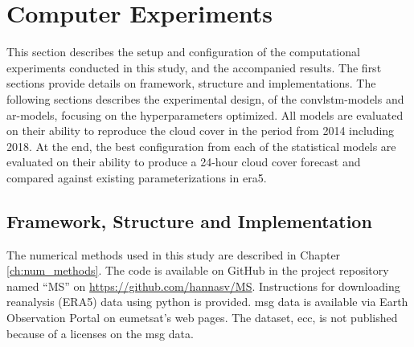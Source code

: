 \section{Computer Experiments} \label{ch:computer_experiments}
This section describes the setup and configuration of the computational experiments conducted in this study, and the accompanied results. The first sections provide details on framework, structure and implementations. The following sections describes the experimental design, %
of the \acrshort{convlstm}-models and \acrshort{ar}-models, focusing on the hyperparameters optimized. All models are evaluated on their ability to reproduce the cloud cover in the period from 2014 including 2018. At the end, the best configuration from each of the statistical models are evaluated on their ability to produce a 24-hour cloud cover forecast and compared against existing parameterizations in \acrshort{era5}.

\subsection{Framework, Structure and Implementation} \label{sec:structure_and_implementations} \label{sec:framework}
The numerical methods used in this study are described in Chapter \ref{ch:num_methods}. The code is available on GitHub in the project repository named ``MS'' on \href{https://github.com/hannasv/MS}{https://github.com/hannasv/MS}. Instructions for downloading 
reanalysis (ERA5) data using python is provided. \acrshort{msg} data is available via Earth Observation Portal on \acrshort{eumetsat}'s web pages. The dataset, \acrshort{ecc}, is not published because of a licenses on the \acrshort{msg} data. %

